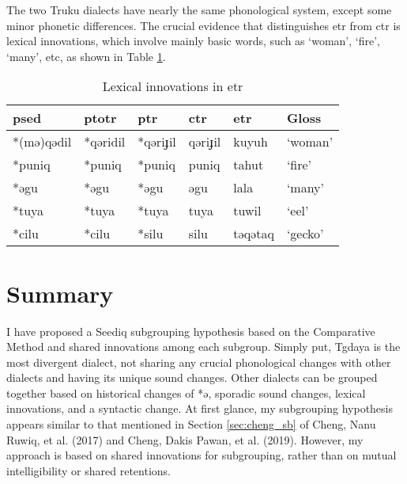 The two Truku dialects have nearly the same phonological system, except some minor phonetic differences. The crucial evidence that distinguishes \acl{etr} from \acl{ctr} is lexical innovations, which involve mainly basic words, such as `woman', `fire', `many', etc, as shown in Table \ref{tab:etrlex}.

\begin{table}[!hbtp]
\centering
\caption{Lexical innovations in \acl{etr}}
\label{tab:etrlex}
\begin{tabular}{llllll}
\hline
\ac{psed}      & \ac{ptotr}   & \ac{ptr}     & \acs{ctr}   & \acs{etr}   & Gloss               \\ \hline
*(mə)qədil & *qəridil & *qəriɟil & qəriɟil & kuyuh   & `woman'         \\
*puniq   & *puniq   & *puniq   & puniq   & tahut   & `fire'          \\
*əgu     & *əgu     & *əgu     & əgu     & lala    & `many'          \\
*tuya    & *tuya    & *tuya    & tuya    & tuwil   & `eel'           \\
*cilu    & *cilu    & *silu    & silu    & təqətaq & `gecko'         \\ \hline
\end{tabular}
\end{table}

\section{Summary}

I have proposed a Seediq subgrouping hypothesis based on the Comparative Method and shared innovations among each subgroup. Simply put, Tgdaya is the most divergent dialect, not sharing any crucial phonological changes with other dialects and having its unique sound changes. Other dialects can be grouped together based on historical changes of *ə, sporadic sound changes, lexical innovations, and a syntactic change. At first glance, my subgrouping hypothesis appears similar to that mentioned in Section \ref{sec:cheng_sb} of Cheng, Nanu Ruwiq, et al. (2017) and Cheng, Dakis Pawan, et al. (2019). However, my approach is based on shared innovations for subgrouping, rather than on mutual intelligibility or shared retentions.